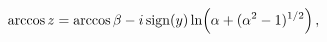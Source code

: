 \[\mathop{\mathrm{arccos}\/}\nolimits z=\mathop{\mathrm{arccos}\/}\nolimits\beta%
-i\mathop{\mathrm{sign}\/}\nolimits\!\left(y\right)\mathop{\ln\/}\nolimits\!%
\left(\alpha+(\alpha^{2}-1)^{1/2}\right),\]